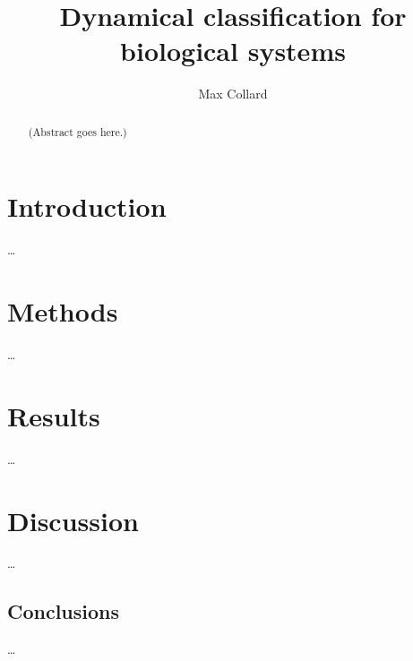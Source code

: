 \documentclass{article}
\title{Dynamical classification for biological systems}
\author{Max Collard}
\begin{document}
\maketitle

\begin{abstract}
    (Abstract goes here.)
\end{abstract}


\section{Introduction}

\ldots


\section{Methods}

\ldots


\section{Results}

\ldots


\section{Discussion}

\ldots

\subsection{Conclusions}

\ldots
\end{document}
